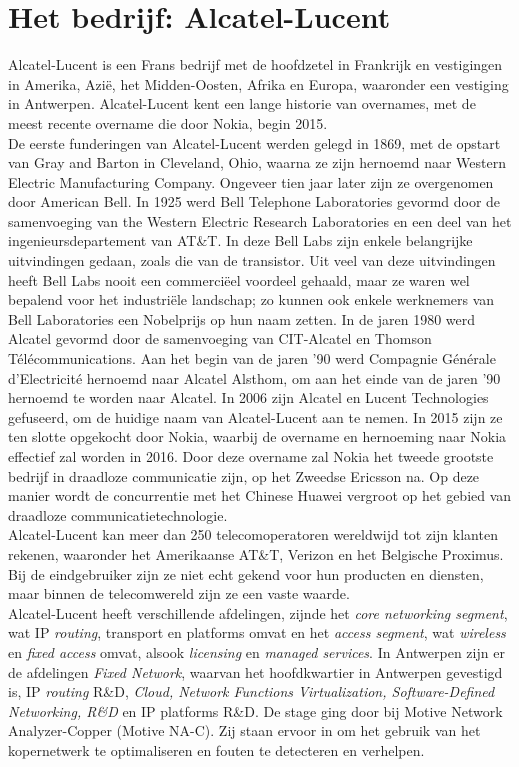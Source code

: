 \documentclass[10pt,a4paper]{article}
\begin{document}
\section{Het bedrijf: Alcatel-Lucent}
\label{bedrijf}
Alcatel-Lucent is een Frans bedrijf met de hoofdzetel in Frankrijk en vestigingen in Amerika, Azi\"e, het Midden-Oosten, Afrika en Europa, waaronder een vestiging in Antwerpen. Alcatel-Lucent kent een lange historie van overnames, met de meest recente overname die door Nokia, begin 2015.\\
De eerste funderingen van Alcatel-Lucent werden gelegd in 1869, met de opstart van Gray and Barton in Cleveland, Ohio, waarna ze zijn hernoemd naar Western Electric Manufacturing Company. Ongeveer tien jaar later zijn ze overgenomen door American Bell. In 1925 werd Bell Telephone Laboratories gevormd door de samenvoeging van the Western Electric Research Laboratories en een deel van het ingenieursdepartement van AT\&T. In deze Bell Labs zijn enkele belangrijke uitvindingen gedaan, zoals die van de transistor. Uit veel van deze uitvindingen heeft Bell Labs nooit een commerci\"eel voordeel gehaald, maar ze waren wel bepalend voor het industri\"ele landschap; zo kunnen ook enkele werknemers van Bell Laboratories een Nobelprijs op hun naam zetten.  In de jaren 1980 werd Alcatel gevormd door de samenvoeging van CIT-Alcatel en Thomson T\'el\'ecommunications. Aan het begin van de jaren '90 werd Compagnie G\'en\'erale d'Electricit\'e hernoemd naar Alcatel Alsthom, om aan het einde van de jaren '90 hernoemd te worden naar Alcatel. In 2006 zijn Alcatel en Lucent Technologies gefuseerd, om de huidige naam van Alcatel-Lucent aan te nemen. In 2015 zijn ze ten slotte opgekocht door Nokia, waarbij de overname en hernoeming naar Nokia effectief zal worden in 2016. Door deze overname zal Nokia het tweede grootste bedrijf in draadloze communicatie zijn, op het Zweedse Ericsson na. Op deze manier wordt de concurrentie met het Chinese Huawei vergroot op het gebied van draadloze communicatietechnologie.\\
Alcatel-Lucent kan meer dan 250 telecomoperatoren wereldwijd tot zijn klanten rekenen, waaronder het Amerikaanse AT\&T, Verizon en het Belgische Proximus. Bij de eindgebruiker zijn ze niet echt gekend voor hun producten en diensten, maar binnen de telecomwereld zijn ze een vaste waarde.\\
Alcatel-Lucent heeft verschillende afdelingen, zijnde het \textit{core networking segment}, wat IP \textit{routing}, transport en platforms omvat en het \textit{access segment}, wat \textit{wireless} en \textit{fixed access} omvat, alsook \textit{licensing} en \textit{managed services}. In Antwerpen zijn er de afdelingen \textit{Fixed Network}, waarvan het hoofdkwartier in Antwerpen gevestigd is, IP \textit{routing} R\&D, \textit{Cloud, Network Functions Virtualization, Software-Defined Networking, R\&D} en IP platforms R\&D. De stage ging door bij Motive Network Analyzer-Copper (Motive NA-C). Zij staan ervoor in om het gebruik van het kopernetwerk te optimaliseren en fouten te detecteren en verhelpen.\\
\end{document}
